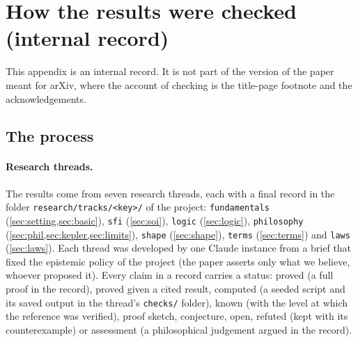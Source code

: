 \section{How the results were checked (internal record)}\label{app:verification}

This appendix is an internal record. It is not part of the version of the paper meant for arXiv, where the account of checking is the title-page footnote and the acknowledgements.

\subsection{The process}

\paragraph{Research threads.} The results come from seven research threads, each with a final record in the folder \texttt{research/tracks/<key>/} of the project: \texttt{fundamentals} (\cref{sec:setting,sec:basic}), \texttt{sfi} (\cref{sec:soi}), \texttt{logic} (\cref{sec:logic}), \texttt{philosophy} (\cref{sec:phil,sec:kepler,sec:limits}), \texttt{shape} (\cref{sec:shape}), \texttt{terms} (\cref{sec:terms}) and \texttt{laws} (\cref{sec:laws}). Each thread was developed by one Claude instance from a brief that fixed the epistemic policy of the project (the paper asserts only what we believe, whoever proposed it). Every claim in a record carries a status: proved (a full proof in the record), proved given a cited result, computed (a seeded script and its saved output in the thread's \texttt{checks/} folder), known (with the level at which the reference was verified), proof sketch, conjecture, open, refuted (kept with its counterexample) or assessment (a philosophical judgement argued in the record).

